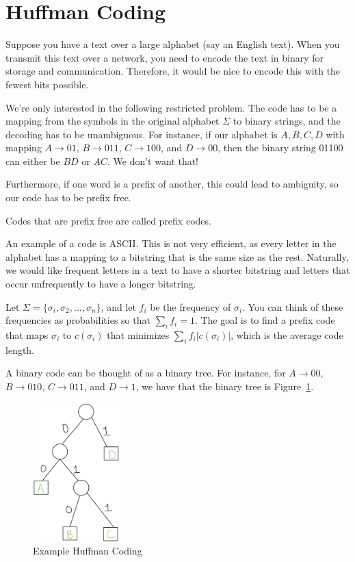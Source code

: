 \section{Huffman Coding}

Suppose you have a text over a large alphabet (say an English text).
When you transmit this text over a network, you need to encode the
text in binary for storage and communication. Therefore, it would be
nice to encode this with the fewest bits possible.

We're only interested in the following restricted problem. The code
has to be a mapping from the symbols in the original alphabet $\Sigma$
to binary strings, and the decoding has to be unambiguous. For
instance, if our alphabet is $A, B, C, D$ with mapping
$A \to 01$, $B \to 011$, $C \to 100$, and $D \to 00$, then the binary
string 01100 can either be $BD$ or $AC$. We don't want that!

Furthermore, if one word is a prefix of another, this could lead to
ambiguity, so our code has to be prefix free. 

\begin{definition}
    Codes that are prefix free are called prefix codes.
\end{definition}

An example of a code is ASCII. This is not very efficient, as every
letter in the alphabet has a mapping to a bitstring that is the same
size as the rest. Naturally, we would like frequent letters in a text
to have a shorter bitstring and letters that occur unfrequently to
have a longer bitstring.

Let $\Sigma = \{\sigma_i, \sigma_2, ..., \sigma_n\}$, and let
$f_i$ be the frequency of $\sigma_i$. You can think of these
frequencies as probabilities so that $\sum_i f_i = 1$. The goal is
to find a prefix code that maps $\sigma_i$ to $c(\sigma_i)$ that
minimizes $\sum_i f_i |c(\sigma_i)|$, which is the average code length.

A binary code can be thought of as a binary tree. For instance, for
$A \to 00$, $B \to 010$, $C \to 011$, and $D \to 1$, we have that the
binary tree is Figure~\ref{fig:huffman}.

\begin{figure}[hpt]
    \centering
    \includegraphics[width=0.3\textwidth]{figures/huffman.jpeg}
    \caption{Example Huffman Coding}
    \label{fig:huffman}
\end{figure}

